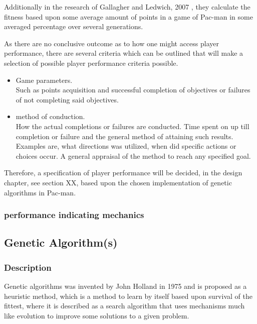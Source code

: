 Additionally in the research of Gallagher and Ledwich, 2007 \cite{Gallagher2007}, they calculate the fitness based upon some average amount of points in a game of Pac-man in some averaged percentage over several generations.

As there are no conclusive outcome as to how one might access player performance, there are several criteria which can be outlined that will make a selection of possible player performance criteria possible.

\begin{itemize}
\item Game parameters.\\
Such as points acquisition and successful completion of objectives or failures of not completing said objectives.
\item method of conduction.\\
How the actual completions or failures are conducted. Time spent on up till completion or failure and the general method of attaining such results. Examples are, what directions was utilized, when did specific actions or choices occur. A general appraisal of the method to reach any specified goal.
\end{itemize}

Therefore, a specification of player performance will be decided, in the design chapter, see section XX, based upon the chosen implementation of genetic algorithms in Pac-man.

\subsubsection{performance indicating mechanics}



\subsection{Genetic Algorithm(s)}\label{ssec:ga}

\subsubsection{Description}
Genetic algorithms was invented by John Holland in 1975 and is proposed as a heuristic method, which is a method to learn by itself based upon survival of the fittest, where it is described as a  search algorithm that uses mechanisms much like evolution to improve some solutions to a given problem. \cite[pp. 20]{Sivanandam2008}

